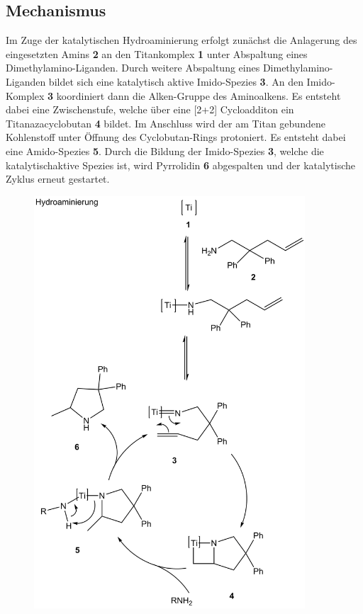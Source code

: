\documentclass[12pt]{article}
\begin{document}
\begin{onehalfspace}
\section{Mechanismus\cite{bio}}
Im Zuge der katalytischen Hydroaminierung erfolgt zunächst die Anlagerung des eingesetzten Amins \textbf{2} an den Titankomplex \textbf{1} unter Abspaltung eines Dimethylamino-Liganden. Durch weitere Abspaltung eines Dimethylamino-Liganden bildet sich eine katalytisch aktive Imido-Spezies \textbf{3}. An den Imido-Komplex \textbf{3} koordiniert dann die Alken-Gruppe des Aminoalkens. Es entsteht dabei eine Zwischenstufe, welche über eine [2+2] Cycloadditon ein Titanazacyclobutan \textbf{4} bildet. Im Anschluss wird der am Titan gebundene Kohlenstoff unter Öffnung des Cyclobutan-Rings protoniert. Es entsteht dabei eine Amido-Spezies \textbf{5}. Durch die Bildung der Imido-Spezies \textbf{3}, welche die katalytischaktive Spezies ist, wird Pyrrolidin \textbf{6} abgespalten und der katalytische Zyklus erneut gestartet.
\newpage
\begin{figure}[!htbp]
\centering
\includegraphics[width=0.9\textwidth]{kat.png}
\end{figure}


\end{onehalfspace}
\end{document}
